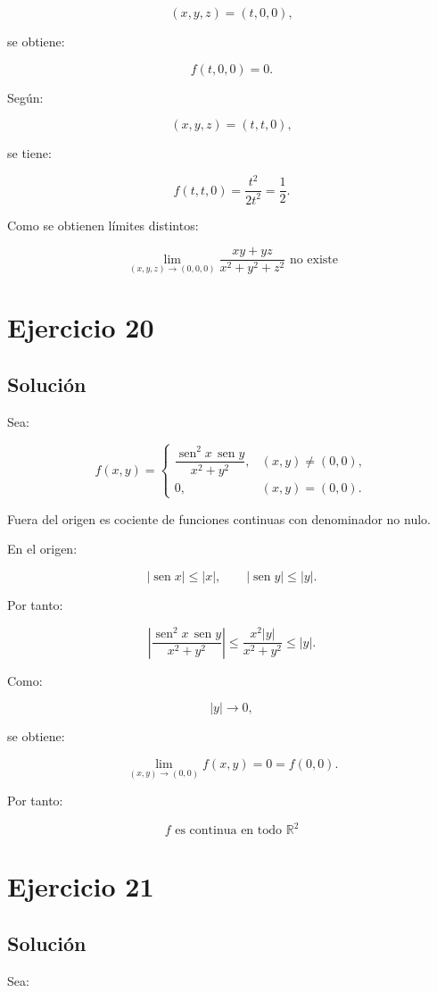 \documentclass[11pt,a4paper]{article}
\newcommand{\R}{\mathbb{R}}
\newcommand{\sen}{\operatorname{sen}}
\begin{document}
\[
(x,y,z)=(t,0,0),
\]

se obtiene:

\[
f(t,0,0)=0.
\]

Según:

\[
(x,y,z)=(t,t,0),
\]

se tiene:

\[
f(t,t,0)
=
\frac{t^2}{2t^2}
=
\frac12.
\]

Como se obtienen límites distintos:

\[
\boxed{
\lim_{(x,y,z)\to(0,0,0)}
\frac{xy+yz}{x^2+y^2+z^2}
\text{ no existe}
}
\]

\section{Ejercicio 20}
\subsection{Solución}

Sea:

\[
f(x,y)
=
\begin{cases}
\dfrac{\sen^2x\,\sen y}{x^2+y^2},
&
(x,y)\neq(0,0),\\[2mm]
0,
&
(x,y)=(0,0).
\end{cases}
\]

Fuera del origen es cociente de funciones continuas con denominador no nulo.

En el origen:

\[
|\sen x|\leq|x|,
\qquad
|\sen y|\leq|y|.
\]

Por tanto:

\[
\left|
\frac{\sen^2x\,\sen y}{x^2+y^2}
\right|
\leq
\frac{x^2|y|}{x^2+y^2}
\leq
|y|.
\]

Como:

\[
|y|\to0,
\]

se obtiene:

\[
\lim_{(x,y)\to(0,0)}f(x,y)=0=f(0,0).
\]

Por tanto:

\[
\boxed{
f\text{ es continua en todo }\R^2
}
\]

\section{Ejercicio 21}
\subsection{Solución}

Sea:
\end{document}
